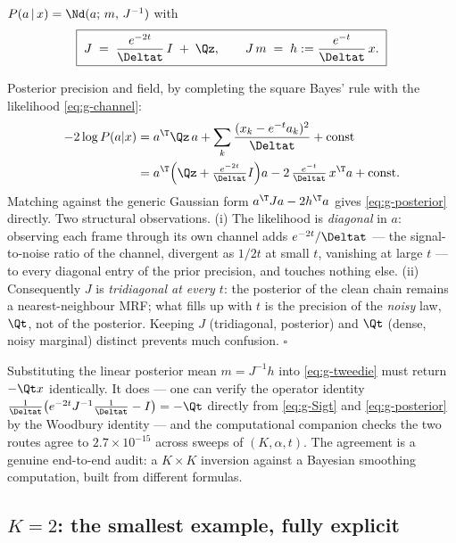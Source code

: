 \begin{proposition}\label{prop:g-posterior}
$P(a \,|\, x) = \Nd(a;\, m,\, J^{-1})$ with
\begin{equation}
  \boxed{\;
  J \;=\; \frac{e^{-2t}}{\Deltat}\, I \;+\; \Qz ,
  \qquad
  J\, m \;=\; h := \frac{e^{-t}}{\Deltat}\, x .
  \;}
  \label{eq:g-posterior}
\end{equation}
\end{proposition}

\begin{toolbox}{Posterior precision and field, by completing the square}
Bayes' rule with the likelihood \eqref{eq:g-channel}:
\begin{align*}
  -2 \log P(a | x)
  &= a^\T \Qz\, a
  + \sum_{k} \frac{(x_k - e^{-t} a_k)^2}{\Deltat}
  + \text{const} \\
  &= a^\T \Big( \Qz + \tfrac{e^{-2t}}{\Deltat} I \Big) a
  - 2\, \tfrac{e^{-t}}{\Deltat}\, x^\T a
  + \text{const}.
\end{align*}
Matching against the generic Gaussian form
$a^\T J a - 2 h^\T a$ gives \eqref{eq:g-posterior} directly. Two structural
observations. (i) The likelihood is \emph{diagonal} in $a$: observing each
frame through its own channel adds $e^{-2t}/\Deltat$ --- the
signal-to-noise ratio of the channel, divergent as $1/2t$ at small $t$,
vanishing at large $t$ --- to every diagonal entry of the prior precision,
and touches nothing else. (ii) Consequently $J$ is \emph{tridiagonal at
every $t$}: the posterior of the clean chain remains a nearest-neighbour
MRF; what fills up with $t$ is the precision of the \emph{noisy} law,
$\Qt$, not of the posterior. Keeping $J$ (tridiagonal, posterior) and
$\Qt$ (dense, noisy marginal) distinct prevents much confusion.
\hfill$\square$
\end{toolbox}

Substituting the linear posterior mean $m = J^{-1} h$ into
\eqref{eq:g-tweedie} must return $-\Qt x$ identically. It does --- one can
verify the operator identity
$\frac{1}{\Deltat}\big( e^{-2t} J^{-1} \tfrac{1}{\Deltat} - I \big) = -\Qt$
directly from \eqref{eq:g-Sigt} and \eqref{eq:g-posterior} by the
Woodbury identity --- and the computational companion checks the two routes
agree to $2.7 \times 10^{-15}$ across sweeps of $(K, \alpha, t)$. The
agreement is a genuine end-to-end audit: a $K \times K$ inversion against a
Bayesian smoothing computation, built from different formulas.

\subsection{$K = 2$: the smallest example, fully explicit}\label{sec:g-K2}

